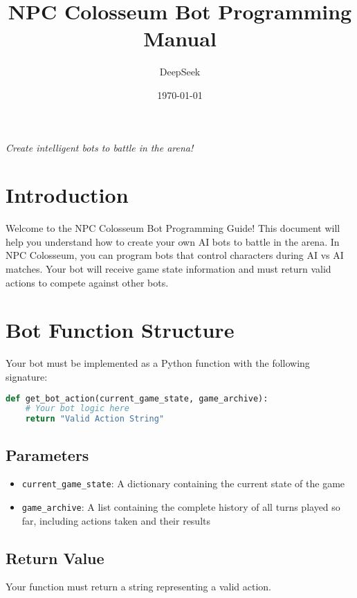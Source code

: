 \documentclass[12pt]{article}
\title{\Huge\textbf{NPC Colosseum Bot Programming Manual}}
\author{DeepSeek}
\date{\today}
\begin{document}
\maketitle

\begin{center}
\textit{Create intelligent bots to battle in the arena!}
\end{center}

\vspace{2em}

\tableofcontents
\newpage

\section{Introduction}
\label{sec:introduction}

Welcome to the NPC Colosseum Bot Programming Guide! This document will help you understand how to create your own AI bots to battle in the arena. In NPC Colosseum, you can program bots that control characters during AI vs AI matches. Your bot will receive game state information and must return valid actions to compete against other bots.

\section{Bot Function Structure}
\label{sec:bot-structure}

Your bot must be implemented as a Python function with the following signature:

\begin{lstlisting}[language=Python, caption=Bot Function Signature]
def get_bot_action(current_game_state, game_archive):
    # Your bot logic here
    return "Valid Action String"
\end{lstlisting}

\subsection{Parameters}
\begin{itemize}
    \item \texttt{current\_game\_state}: A dictionary containing the current state of the game
    \item \texttt{game\_archive}: A list containing the complete history of all turns played so far, including actions taken and their results
\end{itemize}

\subsection{Return Value}
Your function must return a string representing a valid action.
\end{document}
